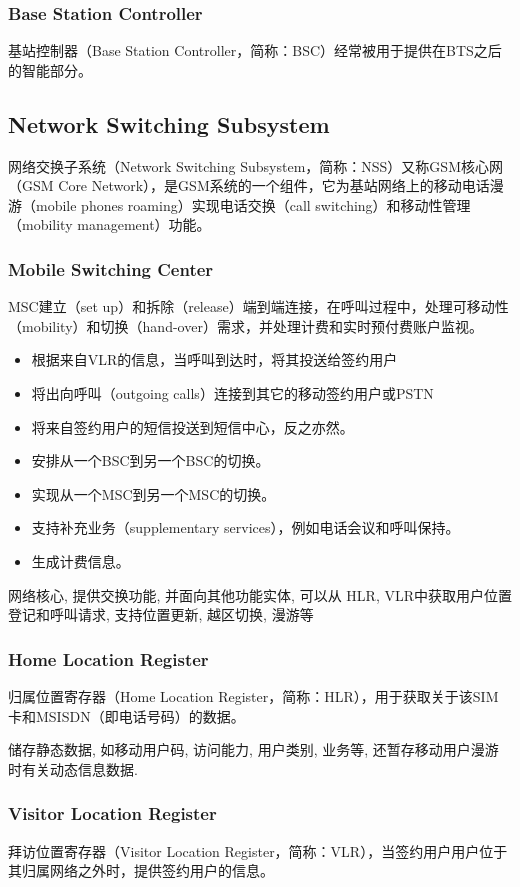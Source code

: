 \documentclass[a4paper]{report}
\begin{document}
\subsubsection{Base Station Controller}
基站控制器（Base Station Controller，简称：BSC）经常被用于提供在BTS之后的智能部分。
 \subsection{Network Switching Subsystem}
 网络交换子系统（Network Switching Subsystem，简称：NSS）又称GSM核心网（GSM Core Network），是GSM系统的一个组件，它为基站网络上的移动电话漫游（mobile phones roaming）实现电话交换（call switching）和移动性管理（mobility management）功能。
 \subsubsection{Mobile Switching Center}
 \label{sec:msc}
 MSC建立（set up）和拆除（release）端到端连接，在呼叫过程中，处理可移动性（mobility）和切换（hand-over）需求，并处理计费和实时预付费账户监视。
 \begin{itemize}
	 \item 根据来自VLR的信息，当呼叫到达时，将其投送给签约用户
	 \item 将出向呼叫（outgoing calls）连接到其它的移动签约用户或PSTN
	 \item 将来自签约用户的短信投送到短信中心，反之亦然。
	 \item 安排从一个BSC到另一个BSC的切换。
	 \item 实现从一个MSC到另一个MSC的切换。
	 \item 支持补充业务（supplementary services），例如电话会议和呼叫保持。
	 \item 生成计费信息。
 \end{itemize}

 网络核心, 提供交换功能, 并面向其他功能实体, 可以从 HLR, VLR中获取用户位置登记和呼叫请求, 支持位置更新, 越区切换, 漫游等
 \subsubsection{Home Location Register}
 归属位置寄存器（Home Location Register，简称：HLR），用于获取关于该SIM卡和MSISDN（即电话号码）的数据。

 储存静态数据, 如移动用户码, 访问能力, 用户类别, 业务等, 还暂存移动用户漫游时有关动态信息数据. 
 \subsubsection{Visitor Location Register}
 拜访位置寄存器（Visitor Location Register，简称：VLR），当签约用户用户位于其归属网络之外时，提供签约用户的信息。
\end{document}
